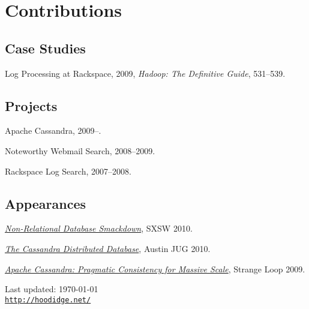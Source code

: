 \documentclass[letterpaper]{article}
\def\footerlink{http://hoodidge.net/}
\renewenvironment{itemize}{
  \begin{list}{}{
    \setlength{\leftmargin}{1.5em}
  }
}{
  \end{list}
}
\begin{document}
\section*{Contributions}

\subsection*{Case Studies}

\begin{itemize}
  \item Log Processing at Rackspace, 2009, {\it Hadoop: The Definitive Guide}, 531--539.
\end{itemize}

\subsection*{Projects}

\begin{itemize}
  \item Apache Cassandra, 2009--.
  \item Noteworthy Webmail Search, 2008--2009.
  \item Rackspace Log Search, 2007--2008.
\end{itemize}

\subsection*{Appearances}

\begin{itemize}
  \item \href{http://www.rackspacecloud.com/blog/2010/06/23/compare-nosql-options-by-watching-the-%E2%80%9Cnon-relational-database-smackdown%E2%80%9D/}{\it Non-Relational Database Smackdown}, SXSW 2010.
  \item \href{http://www.austinjug.org/index.jsp?p=archive-20100126}{\it The Cassandra Distributed Database}, Austin JUG 2010.
  \item \href{http://thestrangeloop.com/blog/09/09/30/speaker-focus-stu-hood-cassandra}{\it Apache Cassandra: Pragmatic Consistency for Massive Scale}, Strange Loop 2009.
\end{itemize}

\bigskip

\begin{center}
  \begin{footnotesize}
    Last updated: \today \\
    \href{\footerlink}{\texttt{\footerlink}}
  \end{footnotesize}
\end{center}
\end{document}
